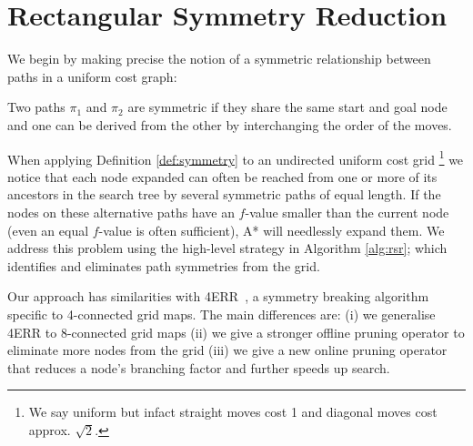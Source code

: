 \section{Rectangular Symmetry Reduction}
\label{sec:rsr}


We begin by making precise the notion of a symmetric relationship between paths
in a uniform cost graph:
\begin{definition}
\label{def:symmetry}
Two paths $\pi_{1}$ and $\pi_{2}$ are symmetric if they share the same start and
goal node and one can be derived from the other by interchanging the order of the
moves.
\end{definition}

When applying Definition \ref{def:symmetry} to an undirected uniform cost grid 
\footnote{We say uniform but infact straight moves cost 1 and diagonal
moves cost approx. $\sqrt{2}$.} we notice that each node expanded can
often be reached from one or more of its ancestors in the search tree by several 
symmetric paths of equal length.
If the nodes on these alternative paths have an $f$-value smaller than the
current node (even an equal $f$-value is often sufficient), A* will needlessly
expand them.  
We address this problem using the high-level strategy in Algorithm
\ref{alg:rsr}; which identifies and eliminates path symmetries from the grid.



Our approach has similarities with 4ERR~\cite{harabor10}, a symmetry breaking algorithm 
specific to 4-connected grid maps.
The main differences are: (i) we generalise 4ERR to 8-connected grid maps 
(ii) we give a stronger offline pruning operator to eliminate more nodes from
the grid (iii) we give a new online pruning operator that reduces a node's branching
factor and further speeds up search.

